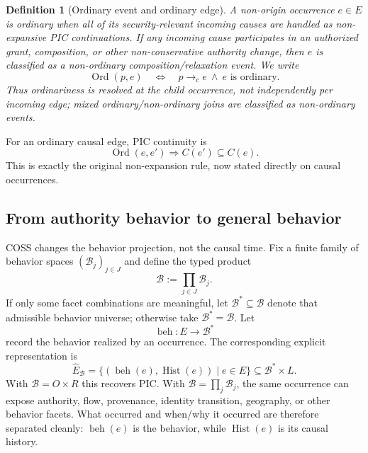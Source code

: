 \documentclass[10pt,twocolumn]{article}
\newcommand{\Hist}{\operatorname{Hist}}
\newcommand{\Beh}{\operatorname{beh}}
\newcommand{\Ord}{\operatorname{Ord}}
\newtheorem{definition}{Definition}
\begin{document}
\begin{definition}[Ordinary event and ordinary edge]
\label{def:ordinary-event}
A non-origin occurrence $e\in E$ is \emph{ordinary} when all of its
security-relevant incoming causes are handled as non-expansive PIC
continuations.  If any incoming cause participates in an authorized grant,
composition, or other non-conservative authority change, then
$e$ is classified as a non-ordinary composition/relaxation event.  We write
\begin{equation}
  \Ord(p,e)
  \quad\Longleftrightarrow\quad
  p\to_c e\ \land\ e\text{ is ordinary}.
  \label{eq:ord-edge}
\end{equation}
Thus ordinariness is resolved at the child occurrence, not independently per
incoming edge; mixed ordinary/non-ordinary joins are classified as
non-ordinary events.
\end{definition}

For an ordinary causal edge, PIC continuity is
\begin{equation}
  \Ord(e,e')
  \Longrightarrow C(e')\subseteq C(e).
  \label{eq:authority-edge}
\end{equation}
This is exactly the original non-expansion rule, now stated directly on causal
occurrences.

\subsection{From authority behavior to general behavior}
\label{sec:leap}

COSS changes the behavior projection, not the causal time.  Fix a finite
family of behavior spaces $(\mathcal B_j)_{j\in J}$ and define the typed product
\begin{equation}
  \mathcal B:=\prod_{j\in J}\mathcal B_j.
\end{equation}
If only some facet combinations are meaningful, let
$\mathcal B^*\subseteq\mathcal B$ denote that admissible behavior universe;
otherwise take $\mathcal B^*=\mathcal B$.  Let
\begin{equation}
  \Beh:E\to\mathcal B^*
\end{equation}
record the behavior realized by an occurrence.  The corresponding explicit
representation is
\begin{equation}
  \widehat E_{\mathcal B}
  =\{(\Beh(e),\Hist(e))\mid e\in E\}
  \subseteq\mathcal B^*\times L.
  \label{eq:behavior-lineage-image}
\end{equation}
With $\mathcal B=O\times R$ this recovers PIC.  With
$\mathcal B=\prod_j\mathcal B_j$, the same occurrence can expose authority,
flow, provenance, identity transition, geography, or other behavior facets.
What occurred and when/why it occurred are therefore separated cleanly:
$\Beh(e)$ is the behavior, while $\Hist(e)$ is its causal history.
\end{document}
